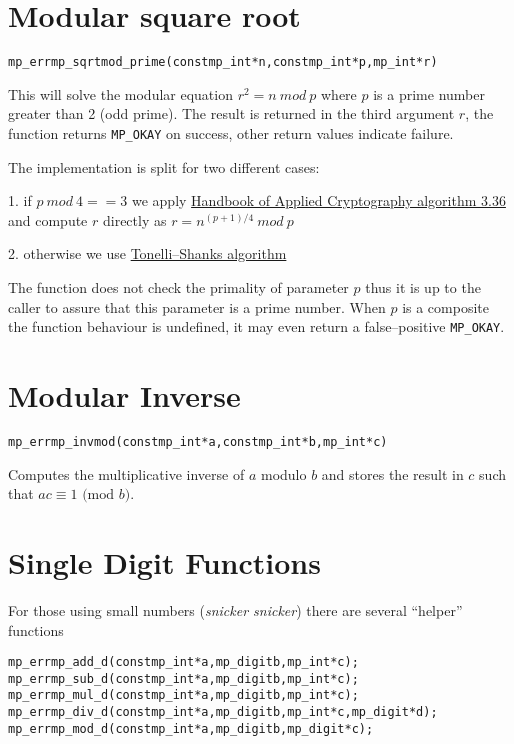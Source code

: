 \documentclass[synpaper]{book}
\def\mod{{\mathit\ mod\ }}
\begin{document}
\section{Modular square root}
\begin{alltt}
mp_err mp_sqrtmod_prime(const mp_int *n, const mp_int *p, mp_int *r)
\end{alltt}

This will solve the modular equation $r^2 = n \mod p$ where $p$ is a prime number greater than 2
(odd prime). The result is returned in the third argument $r$, the function returns
\texttt{MP\_OKAY} on success, other return values indicate failure.

The implementation is split for two different cases:

1. if $p \mod 4 == 3$ we apply \href{http://cacr.uwaterloo.ca/hac/}{Handbook of Applied
  Cryptography algorithm 3.36} and compute $r$ directly as $r = n^{(p+1)/4} \mod p$

2. otherwise we use \href{https://en.wikipedia.org/wiki/Tonelli-Shanks_algorithm}{Tonelli--Shanks
  algorithm}

The function does not check the primality of parameter $p$ thus it is up to the caller to assure
that this parameter is a prime number. When $p$ is a composite the function behaviour is undefined,
it may even return a false--positive \texttt{MP\_OKAY}.

\section{Modular Inverse}
\begin{alltt}
mp_err mp_invmod (const mp_int *a, const mp_int *b, mp_int *c)
\end{alltt}
Computes the multiplicative inverse of $a$ modulo $b$ and stores the result in $c$ such that
$ac \equiv 1 \mbox{ (mod }b\mbox{)}$.

\section{Single Digit Functions}

For those using small numbers (\textit{snicker snicker}) there are several ``helper'' functions

    
\begin{alltt}
mp_err mp_add_d(const mp_int *a, mp_digit b, mp_int *c);
mp_err mp_sub_d(const mp_int *a, mp_digit b, mp_int *c);
mp_err mp_mul_d(const mp_int *a, mp_digit b, mp_int *c);
mp_err mp_div_d(const mp_int *a, mp_digit b, mp_int *c, mp_digit *d);
mp_err mp_mod_d(const mp_int *a, mp_digit b, mp_digit *c);
\end{alltt}
\end{document}
